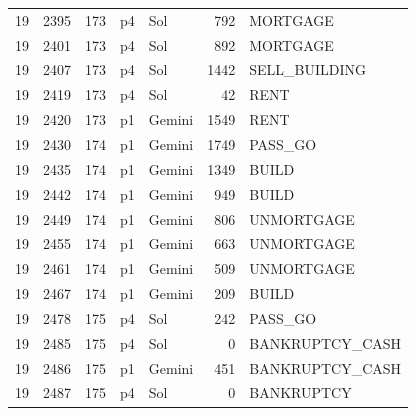 \begin{longtable}{r r r l l r L{2.2in}}
19 & 2395 & 173 & p4 & Sol & 792 & MORTGAGE \\
19 & 2401 & 173 & p4 & Sol & 892 & MORTGAGE \\
19 & 2407 & 173 & p4 & Sol & 1442 & SELL\_BUILDING \\
19 & 2419 & 173 & p4 & Sol & 42 & RENT \\
19 & 2420 & 173 & p1 & Gemini & 1549 & RENT \\
19 & 2430 & 174 & p1 & Gemini & 1749 & PASS\_GO \\
19 & 2435 & 174 & p1 & Gemini & 1349 & BUILD \\
19 & 2442 & 174 & p1 & Gemini & 949 & BUILD \\
19 & 2449 & 174 & p1 & Gemini & 806 & UNMORTGAGE \\
19 & 2455 & 174 & p1 & Gemini & 663 & UNMORTGAGE \\
19 & 2461 & 174 & p1 & Gemini & 509 & UNMORTGAGE \\
19 & 2467 & 174 & p1 & Gemini & 209 & BUILD \\
19 & 2478 & 175 & p4 & Sol & 242 & PASS\_GO \\
19 & 2485 & 175 & p4 & Sol & 0 & BANKRUPTCY\_CASH \\
19 & 2486 & 175 & p1 & Gemini & 451 & BANKRUPTCY\_CASH \\
19 & 2487 & 175 & p4 & Sol & 0 & BANKRUPTCY \\
\end{longtable}
\endgroup
{}
